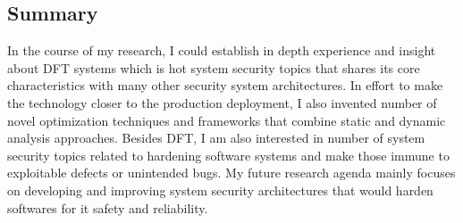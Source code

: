 \documentclass[letterpaper, 10pt]{article}
\begin{document}
\begin{small}
\subsection*{Summary}

In the course of my research, I could establish in depth experience and insight
about DFT systems which is hot system security topics that shares its core
characteristics with many other security system architectures.
%
In effort to make the technology closer to the production deployment, I also
invented number of novel optimization techniques and frameworks that combine
static and dynamic analysis approaches.
%
Besides DFT, I am also interested in number of system security topics related
to hardening software systems and make those immune to exploitable defects or
unintended bugs. 
%
My future research agenda mainly focuses on developing and improving system
security architectures that would harden softwares for it safety and
reliability. 
%
\end{small} \newpage



\end{document}
